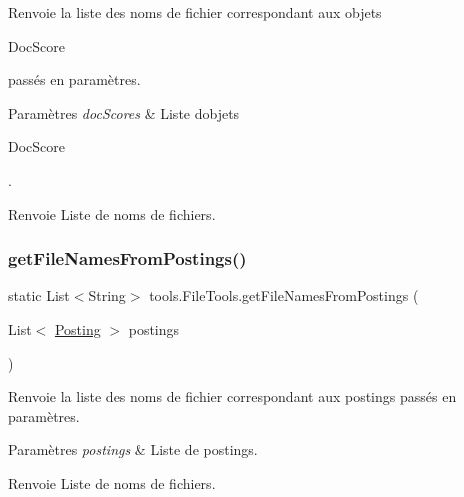 Renvoie la liste des noms de fichier correspondant aux objets
\begin{DoxyCode}
DocScore 
\end{DoxyCode}
 passés en paramètres.


\begin{DoxyParams}{Paramètres}
{\em doc\+Scores} & Liste d\textquotesingle{}objets
\begin{DoxyCode}
DocScore 
\end{DoxyCode}
 . \\
\hline
\end{DoxyParams}
\begin{DoxyReturn}{Renvoie}
Liste de noms de fichiers. 
\end{DoxyReturn}
\mbox{\label{classtools_1_1FileTools_a162f195efa760e0c0edcce9edf5053e3}} 
\subsubsection{\texorpdfstring{get\+File\+Names\+From\+Postings()}{getFileNamesFromPostings()}}
{\footnotesize\ttfamily static List$<$String$>$ tools.\+File\+Tools.\+get\+File\+Names\+From\+Postings (\begin{DoxyParamCaption}\item[{List$<$ \hyperlink{classindexation_1_1content_1_1Posting}{Posting} $>$}]{postings }\end{DoxyParamCaption})\hspace{0.3cm}{\ttfamily [static]}}

Renvoie la liste des noms de fichier correspondant aux postings passés en paramètres.


\begin{DoxyParams}{Paramètres}
{\em postings} & Liste de postings. \\
\hline
\end{DoxyParams}
\begin{DoxyReturn}{Renvoie}
Liste de noms de fichiers. 
\end{DoxyReturn}
\mbox{\label{classtools_1_1FileTools_ab0cdb1cc0faef239c785d61607959b2c}} 
